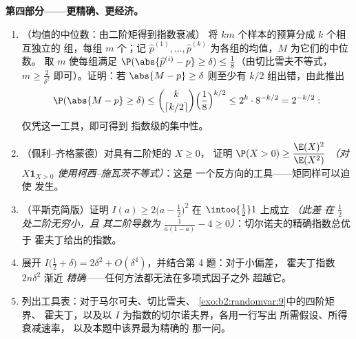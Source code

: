 \begin{problem}
\medskip
\noindent\textbf{第四部分——更精确、更经济。}
\begin{enumerate}[resume]
  \item （均值的中位数：由二阶矩得到指数衰减）
        将 $km$ 个样本的预算分成 $k$ 个相互独立的
        组，每组 $m$ 个；记 $\widehat p^{(1)}, \dots, \widehat
        p^{(k)}$ 为各组的均值，$M$ 为它们的中位数。
        取 $m$ 使每组满足
        $\P(\abs{\widehat p^{(i)} - p} \geq \delta) \leq
        \frac18$（由切比雪夫不等式，$m \geq \frac2{\delta^2}$
        即可）。证明：若 $\abs{M - p} \geq \delta$
        则至少有 $k/2$ 组出错，由此推出
        \[
        \P(\abs{M - p} \geq \delta)
        \leq \binom{k}{\lceil k/2\rceil}\Bigl(\frac18
        \Bigr)^{k/2}
        \leq 2^k\cdot 8^{-k/2} = 2^{-k/2} :
        \]
        仅凭这一工具，即可得到
        指数级的集中性。
  \item （佩利–齐格蒙德）对具有二阶矩的 $X \geq 0$，
        证明 $\P(X > 0) \geq \dfrac{\E(X)^2}{\E(X^2)}$
        \emph{（对 $X\mathbf 1_{X>0}$ 使用柯西–施瓦茨不等式）}：这是
        一个反方向的工具——矩同样可以迫使
        发生。
  \item （平斯克简版）证明 $I(a) \geq 2\bigl(a -
        \tfrac12\bigr)^2$ 在 $\intoo{\frac12}1$ 上成立 \emph{（此差
        在 $\frac12$ 处二阶无穷小，且
        其二阶导数为 $\frac1{a(1-a)} - 4 \geq
        0$）}：切尔诺夫的精确指数总优于
        霍夫丁给出的指数。
  \item 展开 $I\bigl(\tfrac12 + \delta\bigr) = 2\delta^2 +
        O(\delta^4)$，并结合第 4 题：对于小偏差，
        霍夫丁指数 $2n\delta^2$ 渐近
        \emph{精确}——任何方法都无法在多项式因子之外
        超越它。
  \item 列出工具表：对于马尔可夫、切比雪夫、
        \cref{exo:b2:randomvar:9}中的四阶矩界、
        霍夫丁，以及以 $I$ 为指数的切尔诺夫界，各用一行写出
        所需假设、所得衰减速率，
        以及本题中该界最为精确的
        那一问。
\end{enumerate}


\end{problem}
